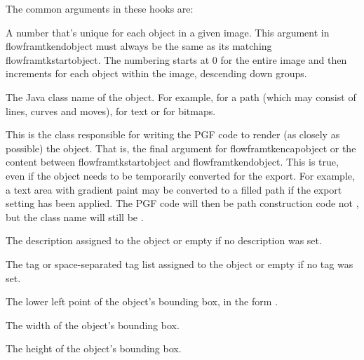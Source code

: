\documentclass[fontsize=12pt]{scrbook}
\begin{document}
The common arguments in these hooks are:
\begin{deflist}
\begin{itemdesc}
A number that's unique for each object in a given image. This argument in 
\gls{flowframtkendobject} must always be the same as its matching
\gls{flowframtkstartobject}. The numbering starts at 0 for the
entire image and then increments for each object within the image,
descending down groups.
\end{itemdesc}

\begin{itemdesc}
The Java class name of the object. For example,  for a
path (which may consist of lines, curves and moves),
 for text or  for bitmaps.

This is the class responsible for writing the PGF code to render (as
closely as possible) the object. That is, the final argument for
\gls{flowframtkencapobject} or the content between
\gls{flowframtkstartobject} and \gls{flowframtkendobject}.
This is true, even if the object needs to be temporarily converted
for the export. For example, a text area with gradient paint may be
converted to a filled path if the  export setting has
been applied. The PGF code will then be path construction code not
, but the class name will still be .
\end{itemdesc}

\begin{itemdesc}
The description assigned to the object or empty if no description
was set.
\end{itemdesc}

\begin{itemdesc}
The tag or space-separated tag list assigned to the object or empty if no tag was set.
\end{itemdesc}

\begin{itemdesc}
The lower left point of the object's bounding box, in the form
.
\end{itemdesc}

\begin{itemdesc}
The width of the object's bounding box.
\end{itemdesc}

\begin{itemdesc}
The height of the object's bounding box.
\end{itemdesc}

\end{deflist}
\end{document}

